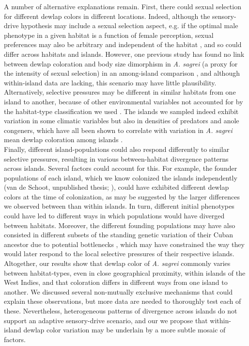 A number of alternative explanations remain. First, there could sexual selection for different dewlap colors in different locations. Indeed, although the sensory-drive hypothesis may include a sexual selection aspect, e.g. if the optimal male phenotype in a given habitat is a function of female perception, sexual preferences may also be arbitrary and independent of the habitat \citep{Andersson1994}, and so could differ across habitats and islands. However, one previous study has found no link between dewlap coloration and body size dimorphism in \textit{A. sagrei} (a proxy for the intensity of sexual selection) in an among-island comparison \citep{Baeckens2018}, and although within-island data are lacking, this scenario may have little plausibility.\\

Alternatively, selective pressures may be different in similar habitats from one island to another, because of other environmental variables not accounted for by the habitat-type classification we used \citep{Howard1950, Schoener1968}. The islands we sampled indeed exhibit variation in some climatic variables but also in densities of predators and anole congeners, which have all been shown to correlate with variation in \textit{A. sagrei} mean dewlap coloration among islands \citep{Vanhooydonck2009, Baeckens2018}.\\

Finally, different island-populations could also respond differently to similar selective pressures, resulting in various between-habitat divergence patterns across islands. Several factors could account for this. For example, the founder populations of each island, which we know colonized the islands independently (van de Schoot, unpublished thesis; \citealt{Driessens2017, Reynolds2020}), could have exhibited different dewlap colors at the time of colonization, as may be suggested by the larger differences we observed between than within islands. In turn, different initial phenotypes could have led to different ways in which populations would have diverged between habitats. Moreover, the different founding populations may have also consisted in different subsets of the standing genetic variation of their Cuban ancestor due to potential bottlenecks \citep{Reynolds2020}, which may have constrained the way they would later respond to the local selective pressures of their respective islands.\\

Altogether, our results show that dewlap color of \textit{A. sagrei} commonly varies between habitat-types, even in close geographical proximity, within islands of the West Indies, and that coloration differs in different ways from one island to another. We discussed several non-mutually exclusive mechanisms that could explain these observations, but more data are needed to thoroughly test each of these. Nevertheless, heterogeneous patterns of divergence across islands do not support an adaptive sensory-drive scenario, and our we propose that within-island dewlap color variation may be underlain by a more subtle mosaic of factors.

